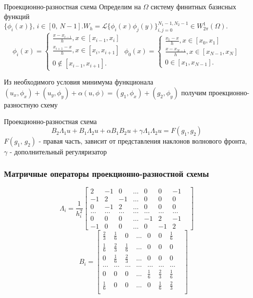 \documentclass[11pt]{beamer}
\begin{document}
\begin{frame}{Проекционно-разностная схема}
Определим на $\Omega$ систему финитных базисных функций $\{\phi_i(x)\} ,\, i \in [0,\,N-1].W_h = \mathscr{L}\{\phi_i(x)\phi_j(y)\}_{i,j=0}^{N_1 - 1,N_2-1} \in W_{2\pi}^{1}(\Omega)$.
$$
\phi_i(x) = 
 \begin{cases}
  \frac{x-x_{i-1}}{h} , x \in [x_{i-1},x_i] \\ 
   \frac{x_{i+1} - x}{h}, x \in [x_{i},x_{i+1}]   \\
   0 \notin [x_{i-1},x_{i+1}].
 \end{cases}\;
\phi_0(x) = 
 \begin{cases}
  \frac{x_1-x}{h} , x \in [x_{0},x_1] \\ 
   \frac{x - x_{N-1}}{h}, x \in [x_{N-1},x_{N}]   \\
   0 \in [x_{1},x_{N-1}].
 \end{cases}
$$
\begin{block}{}
Из необходимого условия минимума функционала $(u_x, \phi_x) + (u_y,\phi_y) + \alpha(u, \phi) = (g_1, \phi_x) + (g_2, \phi_y)$ получим проекционно-разностную схему
\end{block}
\begin{block}{Проекционно-разностная схема}
$$B_2 \Lambda_1 u + B_1 \Lambda_2 u + \alpha B_1 B_2 u + \gamma\Lambda_1\Lambda_2u = F(g_1,g_2)$$
$F(g_1,\,g_2)$ - правая часть, зависит от представления наклонов волнового фронта,\,
$\gamma$ - дополнительный регуляризатор
\end{block}

\end{frame}

\begin{frame}
\frametitle{Матричные операторы проекционно-разностной схемы}
$$\Lambda_i = \frac{1}{h_i^2}
\begin{bmatrix}
2 & -1 & 0 & \ldots & 0 & 0 & -1\\
-1 & 2 & -1 & \ldots & 0 & 0 & 0\\
0 & -1 & 2 & \ldots &0 & 0 & 0\\
\ldots & \ldots & \ldots & \ldots & \ldots & \ldots & \ldots &\\
0 & 0 & 0 & \ldots & -1 & 2 & -1\\
-1 & 0 & 0 & \ldots & 0 & -1 & 2
\end{bmatrix}
$$$$
\qquad B_i = 
\begin{bmatrix}
\frac{2}{3} & \frac{1}{6} & 0 & \ldots & 0 & 0 & \frac{1}{6}\\
\frac{1}{6} & \frac{2}{3} & \frac{1}{6} & \ldots & 0 & 0 & 0\\
0 & \frac{1}{6} & \frac{2}{3} & \ldots &0 & 0 & 0\\
\ldots & \ldots & \ldots & \ldots & \ldots & \ldots & \ldots &\\
0 & 0 & 0 & \ldots & \frac{1}{6} & \frac{2}{3} & \frac{1}{6}\\
\frac{1}{6} & 0 & 0 & \ldots & 0 & \frac{1}{6} & \frac{2}{3} \\
\end{bmatrix}$$

\end{frame}
\end{document}
